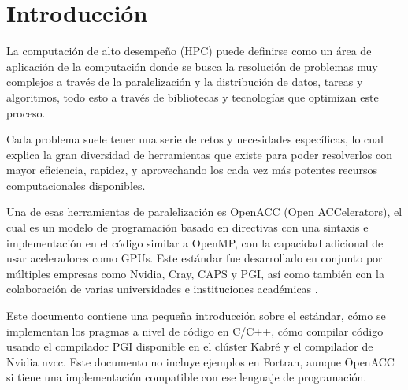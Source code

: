 \chapter{Introducción}
La computación de alto desempeño (HPC) puede definirse como un área de aplicación de la computación donde se busca la resolución de problemas muy complejos a través de la paralelización y la distribución de datos, tareas y algoritmos, todo esto a través de bibliotecas y tecnologías que optimizan este proceso.

Cada problema suele tener una serie de retos y necesidades específicas, lo cual explica la gran diversidad de herramientas que existe para poder resolverlos con mayor eficiencia, rapidez, y aprovechando los cada vez más potentes recursos computacionales disponibles.

Una de esas herramientas de paralelización es OpenACC (Open ACCelerators), el cual es un modelo de programación basado en directivas con una sintaxis e implementación en el código similar a OpenMP, con la capacidad adicional de usar aceleradores como GPUs. Este estándar fue desarrollado en conjunto por múltiples empresas como Nvidia, Cray, CAPS y PGI, así como también con la colaboración de varias universidades e instituciones académicas \cite{parallel_openacc}.

Este documento contiene una pequeña introducción sobre el estándar, cómo se implementan los pragmas a nivel de código en C/C++, cómo compilar código usando el compilador PGI disponible en el clúster Kabré y  el compilador de Nvidia nvcc. Este documento no incluye ejemplos en Fortran, aunque OpenACC si tiene una implementación compatible con ese lenguaje de programación.

\clearpage